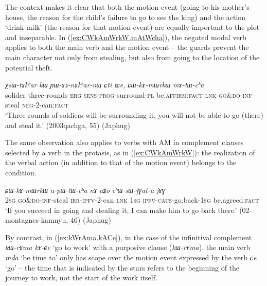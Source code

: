 \documentclass[oneside,a4paper,11pt]{article}
\newcommand{\ipa}[1]{{\phon\textit{#1}}}
\newcommand{\forme}[1]{\textit{\phon#1}}
\newcommand{\japhug}[2]{\textit{\phon#1} `#2'}
\newcommand{\rouge}[1]{{\color{red}#1}}
\begin{document}
The context makes it clear that both the motion event (going to his mother's house, the reason for the child's failure to go to see the king) and the action `drink milk' (the reason for that motion event) are equally important to the plot and inseparable. 
 In (\ref{ex:CWkAmWrkW.mAtWcha}), the negated modal verb applies to both the main verb and the motion event -- the guards prevent the main character not only from stealing, but also from going to the location of the potential theft.
 
\begin{exe}
\ex \label{ex:CWkAmWrkW.mAtWcha}
\gll \ipa{ʁmaʁ}	\ipa{χsɯ-tɤkʰar}	\ipa{kɯ}	\ipa{ɲɯ-ɤz-nɤkʰar-nɯ}	\ipa{ɕti}	\ipa{tɕe,}	\ipa{\rouge{ɕɯ}-kɤ-mɯrkɯ}	\ipa{mɤ-tɯ-cʰa}  \\
solider three-rounds \textsc{erg} \textsc{sens}-\textsc{prog}-surround-\textsc{pl} be.\textsc{affirm}:\textsc{fact} \textsc{lnk}  \rouge{\textsc{go\&do}}-\textsc{inf}-steal \textsc{neg}-2-can:\textsc{fact} \\
\glt `Three rounds of soldiers will be surrounding it, you will not be able to go (there) and steal it.' (2003qachga, 55) (Japhug)
   \end{exe}
 
The same observation also applies to  verbs with AM in complement clauses selected by a verb in the protasis, as in (\ref{ex:CWkAmWrkW}): the realization of the verbal action (in addition to that of the motion event) belongs to the condition.

\begin{exe}
\ex \label{ex:CWkAmWrkW}
\gll \ipa{nɤʑo}	\ipa{\rouge{ɕɯ}-kɤ-mɯrkɯ}	\ipa{a-pɯ-tɯ-cʰa}	\ipa{nɤ}	\ipa{aʑo}	\ipa{cʰɯ-sɯ-jɣat-a}	\ipa{jɤɣ} \\
\textsc{2sg} \rouge{\textsc{go\&do}}-\textsc{inf}-steal \textsc{irr}-\textsc{ipfv}-2-can \textsc{lnk} \textsc{1sg} \textsc{ipfv}-\textsc{caus}-go.back-\textsc{1sg} be.agreed:\textsc{fact} \\
\glt `If you succeed in going and stealing it, I can make him to go back there.' (02-montagnes-kamnyu, 46) (Japhug)
\end{exe}

By contrast, in  (\ref{ex:kWrAma.kACe}), in the case of the infinitival complement \forme{kɯ-rɤma kɤ-ɕe} `go to work' with a purposive clause (\forme{kɯ-rɤma}), the main verb \japhug{mda}{be time to} only has scope over the motion event expressed by the verb \japhug{ɕe}{go} -- the time that is indicated by the stars refers to the beginning of the journey to work, not the start of the work itself.
 
\end{document}
